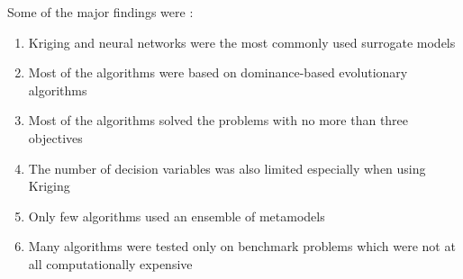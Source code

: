         Some of the major findings were \cite{SoftSurvey}:
        \begin{enumerate}
            \item Kriging and neural networks were the most commonly used surrogate models
            \item Most of the algorithms were based on dominance-based evolutionary algorithms
            \item Most of the algorithms solved the problems with no more than three objectives
            \item The number of decision variables was also limited especially when using Kriging
            \item Only few algorithms used an ensemble of metamodels 
            \item Many algorithms were tested only on benchmark problems which were not at all computationally expensive
        \end{enumerate}